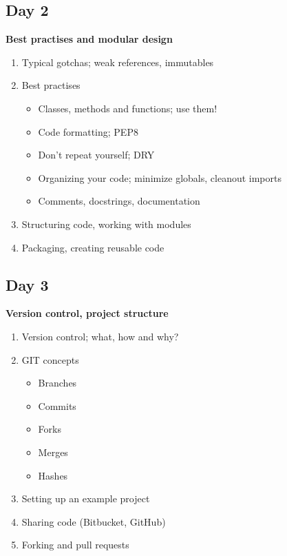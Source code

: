 \documentclass[a4paper, 10pt]{article}
\begin{document}
        \pagebreak[1]

        \subsection{Day 2}
            {\bf Best practises and modular design}

            \begin{enumerate}
                \item Typical gotchas; weak references, immutables
                \item Best practises
                    \begin{itemize}
                        \item Classes, methods and functions; use them!
                        \item Code formatting; PEP8
                        \item Don’t repeat yourself; DRY
                        \item Organizing your code; minimize globals, cleanout imports
                        \item Comments, docstrings, documentation
                    \end{itemize}
                \item Structuring code, working with modules
                \item Packaging, creating reusable code
            \end{enumerate}

        \pagebreak[1]

        \subsection{Day 3}
            {\bf Version control, project structure}

            \begin{enumerate}
                \item Version control; what, how and why?
                \item GIT concepts
                    \begin{itemize}
                        \item Branches
                        \item Commits
                        \item Forks
                        \item Merges
                        \item Hashes
                    \end{itemize}
                \item Setting up an example project
                \item Sharing code (Bitbucket, GitHub)
                \item Forking and pull requests
            \end{enumerate}
\end{document}
